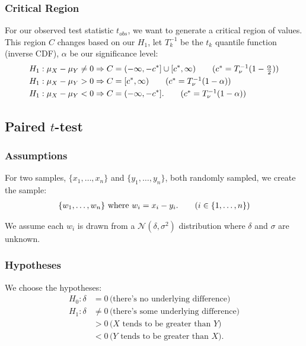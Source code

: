 \documentclass[a4paper, 12pt, twoside]{article}
\begin{document}
\subsubsection{Critical Region}

For our observed test statistic $t_{obs}$, we want to generate a
critical region of values. This region $C$ changes based on our
$H_1$, let $T_k^{-1}$ be the $t_k$ quantile function (inverse CDF),
$\alpha$ be our significance level:
\begin{align*}
    H_1 : \mu_X - \mu_Y \neq 0 & \Rightarrow
    C = (-\infty, -c^*] \cup [c^*, \infty)
    \tag{$ c^* = T^{-1}_{\nu}(1 - \frac{\alpha}{2}) $}            \\
    H_1 : \mu_X - \mu_Y > 0    & \Rightarrow
    C = [c^*, \infty) \tag{$ c^* = T^{-1}_{\nu}(1 - \alpha) $}    \\
    H_1 : \mu_X - \mu_Y < 0    & \Rightarrow C = (-\infty, -c^*].
    \tag{$ c^* = T^{-1}_{\nu}(1 - \alpha) $}
\end{align*}

\newpage

\subsection{Paired $t$-test}

\subsubsection{Assumptions}

For two samples, $\{x_1, \ldots, x_n\}$ and $\{y_1, \ldots, y_n\}$, both
randomly sampled, we create the sample:
\begin{align*}
    \{w_1, \ldots, w_n\} \text{ where } w_i = x_i - y_i. \tag{$i \in \{1, \ldots, n\}$}
\end{align*}

We assume each $w_i$ is drawn from a $\mathcal{N}(\delta, \sigma^2)$
distribution where $\delta$ and $\sigma$ are unknown.

\subsubsection{Hypotheses}

We choose the hypotheses:
\begin{align*}
    H_0 : \delta & = 0 \, \text{(there's no underlying difference)}      \\
    H_1 : \delta & \neq 0 \, \text{(there's some underlying difference)} \\
                 & > 0 \, \text{($X$ tends to be greater than $Y$)}      \\
                 & < 0 \, \text{($Y$ tends to be greater than $X$)}.
\end{align*}
\end{document}
